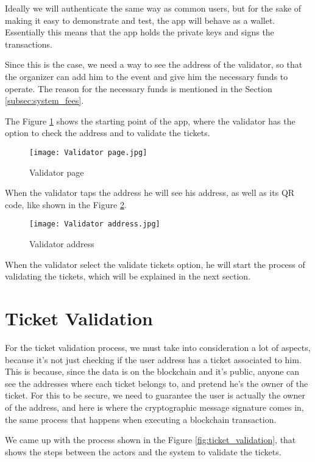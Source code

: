 Ideally we will authenticate the same way as common users, but for the sake of
making it easy to demonstrate and test, the app will behave as a wallet.
Essentially this means that the app holds the private keys and signs the
transactions.

Since this is the case, we need a way to see the address of the validator, so
that the organizer can add him to the event and give him the necessary funds to
operate. The reason for the necessary funds is mentioned in the Section
\ref{subsec:system_fees}.

The Figure \ref{fig:validator_page} shows the starting point of the app, where
the validator has the option to check the address and to validate the tickets.

\begin{figure}[H]
	\texttt{[image: Validator page.jpg]}
	\centering
	\caption{Validator page}
	\label{fig:validator_page}
\end{figure}

When the validator taps the address he will see his address, as well as its QR
code, like shown in the Figure \ref{fig:validator_address}.

\begin{figure}[H]
	\texttt{[image: Validator address.jpg]}
	\centering
	\caption{Validator address}
	\label{fig:validator_address}
\end{figure}

When the validator select the validate tickets option, he will start the
process of validating the tickets, which will be explained in the next section.

\section{Ticket Validation}
\label{sec:ticket_validation}

For the ticket validation process, we must take into consideration a lot of
aspects, because it's not just checking if the user address has a ticket
associated to him. This is because, since the data is on the blockchain and
it's public, anyone can see the addresses where each ticket belongs to, and
pretend he's the owner of the ticket. For this to be secure, we need to
guarantee the user is actually the owner of the address, and here is where the
cryptographic message signature comes in, the same process that happens when
executing a blockchain transaction.

We came up with the process shown in the Figure \ref{fig:ticket_validation},
that shows the steps between the actors and the system to validate the tickets.

